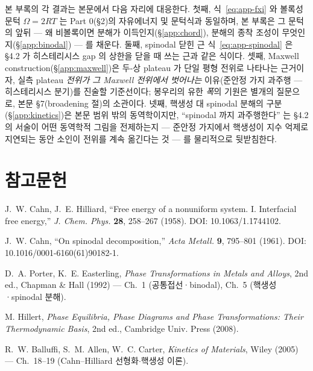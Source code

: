 \documentclass[11pt,a4paper]{article}
\begin{document}
본 부록의 각 결과는 본문에서 다음 자리에 대응한다. 첫째, 식~\eqref{eq:app-fxi} 와 볼록성 문턱
$\Omega=2RT$ 는 Part 0(\S2)의 자유에너지 및 문턱식과 동일하며, 본 부록은 그 문턱의 앞뒤 ---
왜 비볼록이면 분해가 이득인지(\S\ref{app:chord}), 분해의 종착 조성이 무엇인지(\S\ref{app:binodal})
--- 를 채운다. 둘째, spinodal 닫힌 근 식~\eqref{eq:app-spinodal} 은 \S4.2 가 히스테리시스 gap 의
상한을 닫을 때 쓰는 근과 같은 식이다. 셋째, Maxwell construction(\S\ref{app:maxwell})은 두-상
plateau 가 단일 평형 전위로 나타나는 근거이자, 실측 plateau \emph{전위가 그 Maxwell 전위에서
벗어나는} 이유(준안정 가지 과주행 --- 히스테리시스 분기)를 진술할 기준선이다; 봉우리의 유한
\emph{폭}의 기원은 별개의 질문으로, 본문 \S7(broadening 절)의 소관이다. 넷째, 핵생성 대 spinodal 분해의 구분(\S\ref{app:kinetics})은 본문
범위 밖의 동역학이지만, ``spinodal 까지 과주행한다'' 는 \S4.2 의 서술이 어떤 동역학적 그림을
전제하는지 --- 준안정 가지에서 핵생성이 지수 억제로 지연되는 동안 소인이 전위를 계속 옮긴다는 것 ---
를 물리적으로 뒷받침한다.

\section*{참고문헌}
\begin{enumerate}[label={[A\arabic*]},leftmargin=3.2em]
\item J.~W. Cahn, J.~E. Hilliard, ``Free energy of a nonuniform system. I. Interfacial free energy,''
\textit{J. Chem. Phys.} \textbf{28}, 258--267 (1958). DOI: 10.1063/1.1744102.
\item J.~W. Cahn, ``On spinodal decomposition,'' \textit{Acta Metall.} \textbf{9}, 795--801 (1961).
DOI: 10.1016/0001-6160(61)90182-1.
\item D.~A. Porter, K.~E. Easterling, \textit{Phase Transformations in Metals and Alloys}, 2nd ed.,
Chapman \& Hall (1992) --- Ch.~1 (공통접선·binodal), Ch.~5 (핵생성·spinodal 분해).
\item M. Hillert, \textit{Phase Equilibria, Phase Diagrams and Phase Transformations: Their
Thermodynamic Basis}, 2nd ed., Cambridge Univ. Press (2008).
\item R.~W. Balluffi, S.~M. Allen, W.~C. Carter, \textit{Kinetics of Materials}, Wiley (2005) ---
Ch.~18--19 (Cahn--Hilliard 선형화$\cdot$핵생성 이론).
\end{enumerate}
\end{document}
